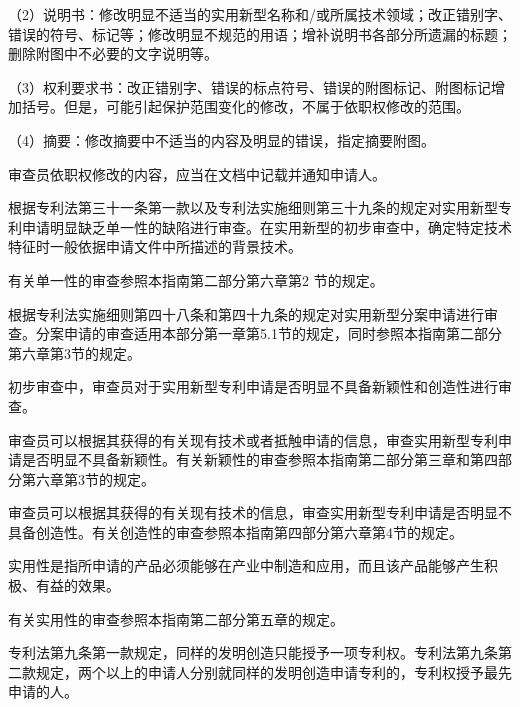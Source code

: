{\setlength{\parindent}{17.1bp}（2）说明书：修改明显不适当的实用新型名称和/或所属技术领域；改正错别字、错误的符号、标记等；修改明显不规范的用语；增补说明书各部分所遗漏的标题；删除附图中不必要的文字说明等。\par}

{\setlength{\parindent}{17.1bp}（3）权利要求书：改正错别字、错误的标点符号、错误的附图标记、附图标记增加括号。但是，可能引起保护范围变化的修改，不属于依职权修改的范围。\par}

{\setlength{\parindent}{17.1bp}（4）摘要：修改摘要中不适当的内容及明显的错误，指定摘要附图。\par}

审查员依职权修改的内容，应当在文档中记载并通知申请人。

根据专利法第三十一条第一款以及专利法实施细则第三十九条的规定对实用新型专利申请明显缺乏单一性的缺陷进行审查。在实用新型的初步审查中，确定特定技术特征时一般依据申请文件中所描述的背景技术。

有关单一性的审查参照本指南第二部分第六章第2 节的规定。

根据专利法实施细则第四十八条和第四十九条的规定对实用新型分案申请进行审查。分案申请的审查适用本部分第一章第5.1节的规定，同时参照本指南第二部分第六章第3节的规定。

初步审查中，审查员对于实用新型专利申请是否明显不具备新颖性和创造性进行审查。

审查员可以根据其获得的有关现有技术或者抵触申请的信息，审查实用新型专利申请是否明显不具备新颖性。有关新颖性的审查参照本指南第二部分第三章和第四部分第六章第3节的规定。

审查员可以根据其获得的有关现有技术的信息，审查实用新型专利申请是否明显不具备创造性。有关创造性的审查参照本指南第四部分第六章第4节的规定。

实用性是指所申请的产品必须能够在产业中制造和应用，而且该产品能够产生积极、有益的效果。

有关实用性的审查参照本指南第二部分第五章的规定。

专利法第九条第一款规定，同样的发明创造只能授予一项专利权。专利法第九条第二款规定，两个以上的申请人分别就同样的发明创造申请专利的，专利权授予最先申请的人。

